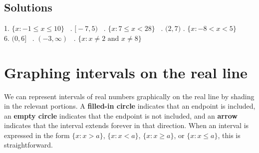 \documentclass[11pt]{book}               %
\begin{document}
\subsection{Solutions} 
1.  $ \{ x : -1 \leq x \leq 10 \}$  \  .  $ \big[ -7, 5 \big) $   \ .  $ \{ x : 7 \leq x < 28 \}$  \  . $ \big( 2, 7 \big) $ .  $ \{ x : -8 < x < 5 \}$  \\
6. $ \big( 0, 6 \big] $  \ . $(-3,\infty)$ \ . $\{x : x\neq 2 \mbox{ and } x\neq 8\}$ \ \quad%

\newpage
\section{Graphing intervals on the real line}%

We can represent intervals of real numbers graphically on the real line by shading in the relevant portions. A \textbf{filled-in circle} indicates that an endpoint is included, an \textbf{empty circle} indicates that the endpoint is not included, and an \textbf{arrow} indicates that the interval extends forever in that direction. When an interval is expressed in the form $\{x : x>a\}$, $\{x : x<a\}$, $\{x : x\geq a\}$, or $\{x : x\leq a\}$, this is straightforward.
\end{document}
